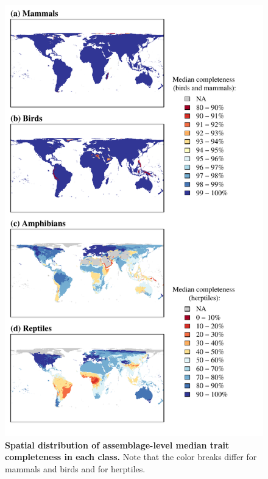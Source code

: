 \begin{figure}[h!]
\vspace*{-2cm}
\centering
\includegraphics[scale=0.95]{Supporting/Chapter2/Figures/Maps/Median_map}
\caption[Spatial distribution of  assemblage-level median trait completeness in each class]{\textbf{Spatial distribution of  assemblage-level median trait completeness in each class.} Note that the color breaks differ for mammals and birds and for herptiles.}
\label{SI2_mediancomp_spatial}
\end{figure}


